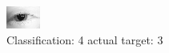 \begin{figure}[h!]
\begin{center}
\includegraphics[width=0.60\columnwidth]{figures/ID71_class_4_target_3.png}
\end{center}
\caption{ Classification: 4 actual target: 3}
\label{fig:ID71_class_4_target_3}
\end{figure}
